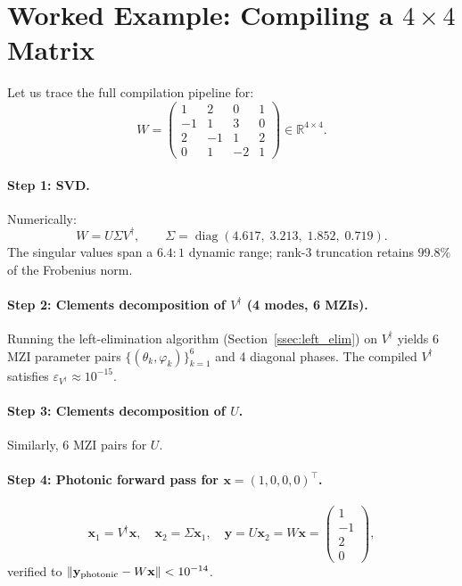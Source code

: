 \documentclass[12pt, a4paper]{article}
\newcommand{\RR}{\mathbb{R}}
\newcommand{\diag}{\operatorname{diag}}
\begin{document}
\section{Worked Example: Compiling a $4\times 4$ Matrix}
\label{sec:example}

Let us trace the full compilation pipeline for:
\begin{equation}
  W = \begin{pmatrix}
    1 & 2 & 0 & 1 \\
    -1 & 1 & 3 & 0 \\
    2 & -1 & 1 & 2 \\
    0 & 1 & -2 & 1
  \end{pmatrix} \in \RR^{4\times4}.
  \label{eq:example_W}
\end{equation}

\paragraph{Step 1: SVD.}
Numerically:
\begin{equation}
  W = U\Sigma V^\dagger, \qquad
  \Sigma = \diag(4.617,\; 3.213,\; 1.852,\; 0.719).
  \label{eq:example_svd}
\end{equation}
The singular values span a $6.4:1$ dynamic range; rank-3 truncation retains
$99.8\%$ of the Frobenius norm.

\paragraph{Step 2: Clements decomposition of $V^\dagger$ (4 modes, 6 MZIs).}
Running the left-elimination algorithm (Section~\ref{ssec:left_elim})
on $V^\dagger$ yields 6 MZI parameter pairs
$\{(\theta_k,\varphi_k)\}_{k=1}^6$ and 4 diagonal phases.
The compiled $V^\dagger$ satisfies $\varepsilon_{V^\dagger}\approx10^{-15}$.

\paragraph{Step 3: Clements decomposition of $U$.}
Similarly, 6 MZI pairs for $U$.

\paragraph{Step 4: Photonic forward pass for $\mathbf{x}=(1,0,0,0)^\top$.}
\begin{equation}
  \mathbf{x}_1 = V^\dagger\mathbf{x},\quad
  \mathbf{x}_2 = \Sigma\mathbf{x}_1,\quad
  \mathbf{y} = U\mathbf{x}_2 = W\mathbf{x}
  = \begin{pmatrix}1\\-1\\2\\0\end{pmatrix},
\end{equation}
verified to $\|\mathbf{y}_{\rm photonic} - W\mathbf{x}\| < 10^{-14}$.
\end{document}
